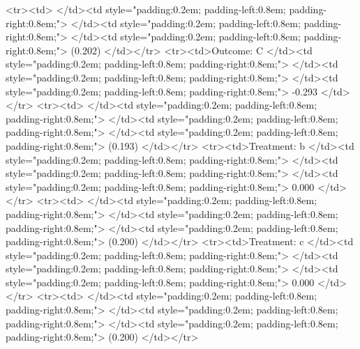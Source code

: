<tr><td>                     </td><td style="padding:0.2em; padding-left:0.8em; padding-right:0.8em;">          </td><td style="padding:0.2em; padding-left:0.8em; padding-right:0.8em;">                  </td><td style="padding:0.2em; padding-left:0.8em; padding-right:0.8em;">                                                                                        (0.202) </td></tr>
<tr><td>Outcome: C           </td><td style="padding:0.2em; padding-left:0.8em; padding-right:0.8em;">          </td><td style="padding:0.2em; padding-left:0.8em; padding-right:0.8em;">                  </td><td style="padding:0.2em; padding-left:0.8em; padding-right:0.8em;">                                                                                         -0.293 </td></tr>
<tr><td>                     </td><td style="padding:0.2em; padding-left:0.8em; padding-right:0.8em;">          </td><td style="padding:0.2em; padding-left:0.8em; padding-right:0.8em;">                  </td><td style="padding:0.2em; padding-left:0.8em; padding-right:0.8em;">                                                                                        (0.193) </td></tr>
<tr><td>Treatment: b         </td><td style="padding:0.2em; padding-left:0.8em; padding-right:0.8em;">          </td><td style="padding:0.2em; padding-left:0.8em; padding-right:0.8em;">                  </td><td style="padding:0.2em; padding-left:0.8em; padding-right:0.8em;">                                                                                          0.000 </td></tr>
<tr><td>                     </td><td style="padding:0.2em; padding-left:0.8em; padding-right:0.8em;">          </td><td style="padding:0.2em; padding-left:0.8em; padding-right:0.8em;">                  </td><td style="padding:0.2em; padding-left:0.8em; padding-right:0.8em;">                                                                                        (0.200) </td></tr>
<tr><td>Treatment: c         </td><td style="padding:0.2em; padding-left:0.8em; padding-right:0.8em;">          </td><td style="padding:0.2em; padding-left:0.8em; padding-right:0.8em;">                  </td><td style="padding:0.2em; padding-left:0.8em; padding-right:0.8em;">                                                                                          0.000 </td></tr>
<tr><td>                     </td><td style="padding:0.2em; padding-left:0.8em; padding-right:0.8em;">          </td><td style="padding:0.2em; padding-left:0.8em; padding-right:0.8em;">                  </td><td style="padding:0.2em; padding-left:0.8em; padding-right:0.8em;">                                                                                        (0.200) </td></tr>
